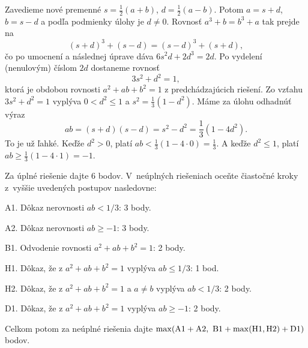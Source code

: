 {\ineriesenie
Zavedieme nové premenné $s=\frac12(a+b)$, $d=\frac12(a-b)$. Potom $a=s+d$, $b=s-d$ a podľa podmienky úlohy je $d\ne 0$. Rovnosť $a^3+b=b^3+a$ tak prejde na
$$
(s+d)^3+(s-d) = (s-d)^3+(s+d),
$$
čo po umocnení a následnej úprave dáva $6s^2d+2d^3=2d$.
Po vydelení (nenulovým) číslom $2d$ dostaneme rovnosť
$$
3s^2+d^2=1,
$$
ktorá je obdobou rovnosti $a^2+ab+b^2=1$ z predchádzajúcich riešení.
Zo vzťahu $3s^2+d^2=1$ vyplýva $0<d^2\le 1$ a $s^2=\frac13(1-d^2)$.
Máme za úlohu odhadnúť výraz
$$ab=(s+d)(s-d)=s^2-d^2=\frac13(1-4d^2).$$
To je už ľahké. Keďže $d^2>0$, platí $ab<\frac13(1-4\cdot 0)=\frac13$.
A keďže $d^2\le1$, platí $ab\ge \frac13(1-4\cdot 1)={-1}$.

\schemaABC
Za úplné riešenie dajte 6 bodov. V~neúplných riešeniach oceňte čiastočné kroky z~vyššie uvedených postupov nasledovne:

\smallskip
\item{A1.} Dôkaz nerovnosti $ab<1/3$: 3 body.
\item{A2.} Dôkaz nerovnosti $ab\ge -1$: 3 body.
\item{B1.} Odvodenie rovnosti $a^2+ab+b^2=1$: 2 body.
\item{H1.} Dôkaz, že z $a^2+ab+b^2=1$ vyplýva $ab\le 1/3$: 1 bod.
\item{H2.} Dôkaz, že z $a^2+ab+b^2=1$ a $a\ne b$ vyplýva $ab<1/3$: 2 body.
\item{D1.} Dôkaz, že z $a^2+ab+b^2=1$ vyplýva $ab\ge -1$: 2 body.

\smallskip\noindent
Celkom potom za neúplné riešenia dajte $\rm\max(A1+A2,\ B1+\max(H1,H2)+D1)$ bodov.
\endschema
}

